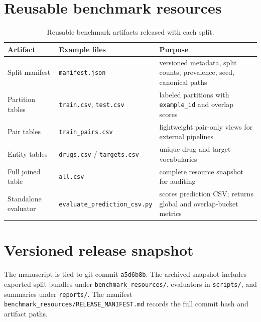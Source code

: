 \documentclass[referee,pdflatex,sn-basic,Numbered]{sn-jnl}
\begin{document}
\begin{appendices}
\section{Reusable benchmark resources}

\begin{table}[t]
  \centering
  \scriptsize
  \caption{Reusable benchmark artifacts released with each split.}
  \label{tab:resource-release}
  \setlength{\tabcolsep}{3.5pt}
  \begin{tabular*}{\textwidth}{@{\extracolsep{\fill}}lp{}p{}@{}}
    \toprule
    Artifact & Example files & Purpose \\
    \midrule
    Split manifest & \texttt{manifest.json} & versioned metadata, split counts, prevalence, seed, canonical paths \\
    Partition tables & \texttt{train.csv}, \texttt{test.csv} & labeled partitions with \texttt{example\_id} and overlap scores \\
    Pair tables & \texttt{train\_pairs.csv} & lightweight pair-only views for external pipelines \\
    Entity tables & \texttt{drugs.csv} / \texttt{targets.csv} & unique drug and target vocabularies \\
    Full joined table & \texttt{all.csv} & complete resource snapshot for auditing \\
    Standalone evaluator & \texttt{evaluate\_prediction\_csv.py} & scores prediction CSV; returns global and overlap-bucket metrics \\
    \bottomrule
  \end{tabular*}
\end{table}

\section{Versioned release snapshot}

The manuscript is tied to git commit \texttt{a5d6b8b}. The archived snapshot includes exported split bundles under \texttt{benchmark\_resources/}, evaluators in \texttt{scripts/}, and summaries under \texttt{reports/}. The manifest \texttt{benchmark\_resources/RELEASE\_MANIFEST.md} records the full commit hash and artifact paths.

\end{appendices}


\end{document}
